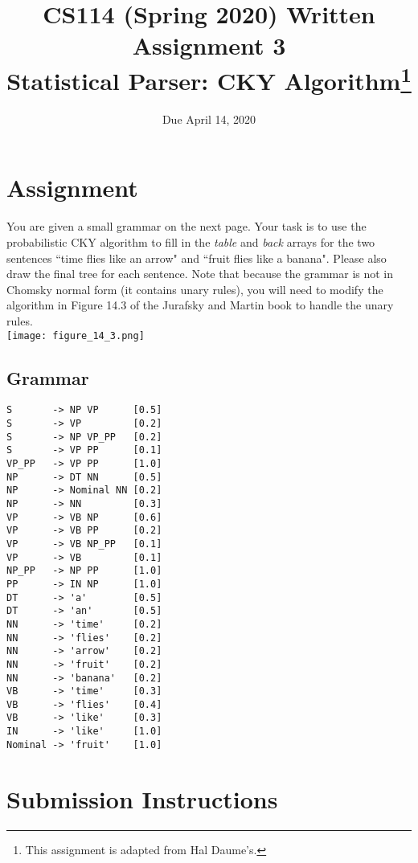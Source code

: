 \documentclass[11pt,letterpaper]{article}
\begin{document}
\title{CS114 (Spring 2020) Written Assignment 3 \\ Statistical Parser: CKY Algorithm\footnote{This assignment is adapted from Hal Daume's.}}
\author{Due April 14, 2020}
\date{}
\maketitle

\section*{Assignment}

You are given a small grammar on the next page. Your task is to use the probabilistic CKY algorithm to fill in the \textit{table} and \textit{back} arrays for the two sentences ``time flies like an arrow" and ``fruit flies like a banana". Please also draw the final tree for each sentence. Note that because the grammar is not in Chomsky normal form (it contains unary rules), you will need to modify the algorithm in Figure 14.3 of the Jurafsky and Martin book to handle the unary rules.\\

\noindent\texttt{[image: figure\_14\_3.png]}

\subsection*{Grammar}

\begin{verbatim}
S       -> NP VP      [0.5]
S       -> VP         [0.2]
S       -> NP VP_PP   [0.2]
S       -> VP PP      [0.1]
VP_PP   -> VP PP      [1.0]
NP      -> DT NN      [0.5]
NP      -> Nominal NN [0.2]
NP      -> NN         [0.3]
VP      -> VB NP      [0.6]
VP      -> VB PP      [0.2]
VP      -> VB NP_PP   [0.1]
VP      -> VB         [0.1]
NP_PP   -> NP PP      [1.0]
PP      -> IN NP      [1.0]
DT      -> 'a'        [0.5]
DT      -> 'an'       [0.5]
NN      -> 'time'     [0.2]
NN      -> 'flies'    [0.2]
NN      -> 'arrow'    [0.2]
NN      -> 'fruit'    [0.2]
NN      -> 'banana'   [0.2]
VB      -> 'time'     [0.3]
VB      -> 'flies'    [0.4]
VB      -> 'like'     [0.3]
IN      -> 'like'     [1.0]
Nominal -> 'fruit'    [1.0]
\end{verbatim}\newpage

\section*{Submission Instructions}
\end{document}
